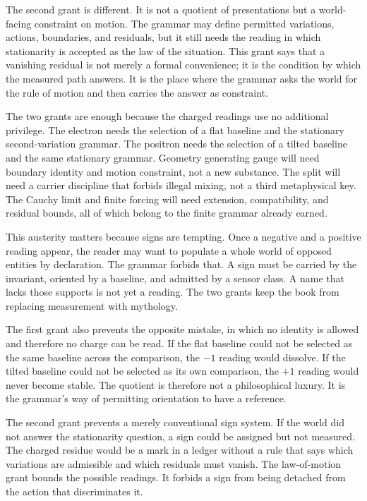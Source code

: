 The second grant is different. It is not a quotient of presentations but a
world-facing constraint on motion. The grammar may define permitted
variations, actions, boundaries, and residuals, but it still needs the
reading in which stationarity is accepted as the law of the situation. This
grant says that a vanishing residual is not merely a formal convenience; it
is the condition by which the measured path answers. It is the place where
the grammar asks the world for the rule of motion and then carries the
answer as constraint.

The two grants are enough because the charged readings use no additional
privilege. The electron needs the selection of a flat baseline and the
stationary second-variation grammar. The positron needs the selection of a
tilted baseline and the same stationary grammar. Geometry generating gauge
will need boundary identity and motion constraint, not a new substance.
The split will need a carrier discipline that forbids illegal mixing, not a
third metaphysical key. The Cauchy limit and finite forcing will need
extension, compatibility, and residual bounds, all of which belong to the
finite grammar already earned.

This austerity matters because signs are tempting. Once a negative and a
positive reading appear, the reader may want to populate a whole world of
opposed entities by declaration. The grammar forbids that. A sign must be
carried by the invariant, oriented by a baseline, and admitted by a sensor
class. A name that lacks those supports is not yet a reading. The two grants
keep the book from replacing measurement with mythology.

The first grant also prevents the opposite mistake, in which no identity is
allowed and therefore no charge can be read. If the flat baseline could not
be selected as the same baseline across the comparison, the \(-1\) reading
would dissolve. If the tilted baseline could not be selected as its own
comparison, the \(+1\) reading would never become stable. The quotient is
therefore not a philosophical luxury. It is the grammar's way of permitting
orientation to have a reference.

The second grant prevents a merely conventional sign system. If the world
did not answer the stationarity question, a sign could be assigned but not
measured. The charged residue would be a mark in a ledger without a rule
that says which variations are admissible and which residuals must vanish.
The law-of-motion grant bounds the possible readings. It forbids a sign from
being detached from the action that discriminates it.

